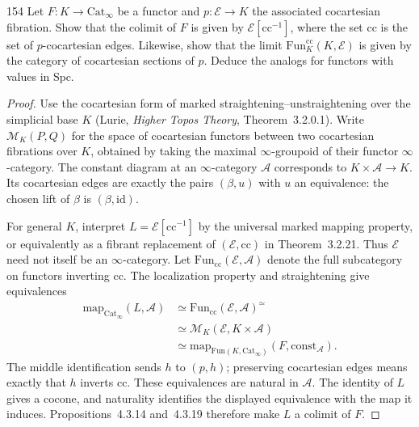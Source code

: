 \begin{exercise}{154}
Let $F\colon K\to\mathrm{Cat}_\infty$ be a functor and $p\colon\mathcal{E}\to K$ the associated cocartesian
fibration. Show that the colimit of $F$ is given by $\mathcal{E}[\mathrm{cc}^{-1}]$, where the set $\mathrm{cc}$ is the set of
$p$-cocartesian edges. Likewise, show that the limit $\mathrm{Fun}^{\mathrm{cc}}_K(K,\mathcal{E})$ is given by the category of
cocartesian sections of $p$. Deduce the analogs for functors with values in $\mathrm{Spc}$.

\begin{proof}
Use the cocartesian form of marked straightening--unstraightening
over the simplicial base $K$
(Lurie, \emph{Higher Topos Theory}, Theorem~3.2.0.1).
Write $\mathcal{M}_K(P,Q)$ for the space of cocartesian functors
between two cocartesian fibrations over $K$, obtained by taking the
maximal $\infty$-groupoid of their functor $\infty$-category.
The constant diagram at an $\infty$-category $\mathcal{A}$ corresponds
to $K\times\mathcal{A}\to K$.
Its cocartesian edges are exactly the pairs $(\beta,u)$ with $u$
an equivalence: the chosen lift of $\beta$ is $(\beta,\mathrm{id})$.

For general $K$, interpret $L=\mathcal{E}[\mathrm{cc}^{-1}]$ by
the universal marked mapping property, or equivalently as a fibrant
replacement of $(\mathcal{E},\mathrm{cc})$ in Theorem~3.2.21.
Thus $\mathcal{E}$ need not itself be an $\infty$-category.
Let $\mathrm{Fun}_{\mathrm{cc}}(\mathcal{E},\mathcal{A})$ denote the full
subcategory on functors inverting $\mathrm{cc}$.
The localization property and straightening give equivalences
\[
 \begin{aligned}
 \mathrm{map}_{\mathrm{Cat}_\infty}(L,\mathcal{A})
 &\simeq\mathrm{Fun}_{\mathrm{cc}}(\mathcal{E},\mathcal{A})^{\simeq}\\
 &\simeq\mathcal{M}_K(\mathcal{E},K\times\mathcal{A})\\
 &\simeq\mathrm{map}_{\mathrm{Fun}(K,\mathrm{Cat}_\infty)}
       (F,\mathrm{const}_{\mathcal{A}}).
 \end{aligned}
\]
The middle identification sends $h$ to $(p,h)$; preserving
cocartesian edges means exactly that $h$ inverts $\mathrm{cc}$.
These equivalences are natural in $\mathcal{A}$.
The identity of $L$ gives a cocone, and naturality identifies the
displayed equivalence with the map it induces.
Propositions~4.3.14 and~4.3.19 therefore make $L$ a colimit of $F$.


\end{proof}
\end{exercise}
